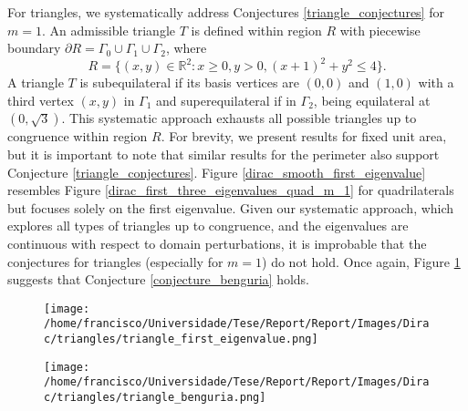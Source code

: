 \documentclass[5p,authoryear]{elsarticle}
\begin{document}
For triangles, we systematically address Conjectures \ref{triangle_conjectures} for \(m=1\). An admissible triangle \(T\) is defined within region \(R\) with piecewise boundary \(\partial R = \Gamma_0 \cup \Gamma_1 \cup \Gamma_2\), where
\[
    R = \{(x, y) \in \mathbb{R}^2: x \geq 0, y > 0, (x+1)^2 + y^2 \leq 4\}.
\]
A triangle \(T\) is subequilateral if its basis vertices are \((0, 0)\) and \((1, 0)\) with a third vertex \((x, y)\) in \(\Gamma_1\) and superequilateral if in \(\Gamma_2\), being equilateral at \((0, \sqrt{3})\). This systematic approach exhausts all possible triangles up to congruence within region \(R\). For brevity, we present results for fixed unit area, but it is important to note that similar results for the perimeter also support Conjecture \ref{triangle_conjectures}. Figure \ref{dirac_smooth_first_eigenvalue} resembles Figure \ref{dirac_first_three_eigenvalues_quad_m_1} for quadrilaterals but focuses solely on the first eigenvalue. Given our systematic approach, which explores all types of triangles up to congruence, and the eigenvalues are continuous with respect to domain perturbations, it is improbable that the conjectures for triangles (especially for \(m=1\)) do not hold. Once again, Figure \ref{dirac_triangle_benguria} suggests that Conjecture \ref{conjecture_benguria} holds.
\begin{figure}[h]
    \centering
    \begin{minipage}{.25\textwidth}
      \centering
      \texttt{[image: /home/francisco/Universidade/Tese/Report/Report/Images/Dirac/triangles/triangle\_first\_eigenvalue.png]}
      \captionsetup{width=0.9\linewidth} %
    \label{dirac_smooth_first_eigenvalue}
\end{minipage}%
    \begin{minipage}{.25\textwidth}
      \centering
      \texttt{[image: /home/francisco/Universidade/Tese/Report/Report/Images/Dirac/triangles/triangle\_benguria.png]}
      \captionsetup{width=0.9\linewidth} %
    \label{dirac_triangle_benguria}
\end{minipage}
\end{figure}
\end{document}
